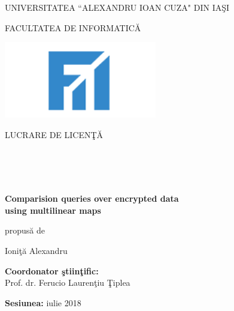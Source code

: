\documentclass[a4paper, 12pt, oneside]{article}
\begin{document}
\setlength\parindent{0pt}
\renewcommand{\baselinestretch}{1.35}

\begin{titlepage}

\begin{center}
\begin{large}
UNIVERSITATEA ``ALEXANDRU IOAN CUZA" DIN IA\c SI
\end{large}

\vspace{4mm}

\begin{huge}
FACULTATEA DE INFORMATIC\u A
\end{huge}
\end{center}

\vspace{35mm}

\begin{center}
\includegraphics[width=0.5\textwidth]{img/fii.png}
\end{center}
 
\vspace{15mm}

\begin{center}
\begin{Large}
LUCRARE DE LICEN\c T\u A
\end{Large}
\\
\
\\
\
\
\begin{LARGE}
\textbf{Comparision queries over encrypted data \\using multilinear maps}
\end{LARGE}

\vspace{10mm}

\begin{large}
propus\u a de
\end{large}

\vspace{10mm}

\begin{LARGE}
Ioni\c t\u a Alexandru
\end{LARGE}

\vspace{25mm}

\textbf{Coordonator \c stiin\c tific:}\\
Prof. dr. Ferucio Lauren\c tiu \c Tiplea\\

\end{center}

\vfill

\begin{center}
\textbf{Sesiunea:} iulie 2018
\end{center}

\end{titlepage}
\newpage
\end{document}
